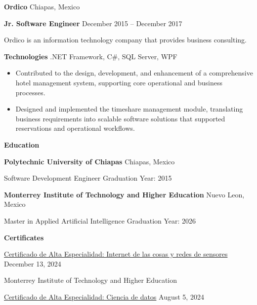 \documentclass[11pt]{article}
\begin{document}
\vspace{5pt}

\textbf{Ordico} \hfill Chiapas, Mexico

\textbf{Jr. Software Engineer} \hfill December 2015 – December 2017

Ordico is an information technology company that provides business consulting.

\textbf{Technologies} .NET Framework, C\#, SQL Server, WPF
\begin{itemize}[noitemsep, topsep=0pt, partopsep=0pt, parsep=0pt]

    \item Contributed to the design, development, and enhancement of a comprehensive hotel management system, supporting core operational and business processes.
    \item Designed and implemented the timeshare management module, translating business requirements into scalable software solutions that supported reservations  and operational workflows.
    
\end{itemize}



\begin{center}
    \textbf{Education}
\end{center}
\textbf{Polytechnic University of Chiapas} \hfill Chiapas, Mexico

 Software Development Engineer \hfill Graduation Year: 2015

\vspace{2pt}

\textbf{Monterrey Institute of Technology and Higher Education} \hfill Nuevo Leon, Mexico

Master in Applied Artificial Intelligence \hfill	Graduation Year: 2026
\vspace{5pt}

\begin{center}
    \textbf{Certificates}
\end{center}
\href{https://www.credential.net/b0dc8bb5-8edd-4c65-8f17-d328f12c458b#acc.f4gCmXTJ}{Certificado de Alta Especialidad: Internet de las cosas y redes de sensores} \hfill December 13, 2024

Monterrey Institute of Technology and Higher Education

\href{https://www.credential.net/ef097d2b-4f91-4aca-bb31-bda0e7aee12b#acc.fWCGyXBI}{Certificado de Alta Especialidad: Ciencia de datos} \hfill August 5, 2024
\end{document}
